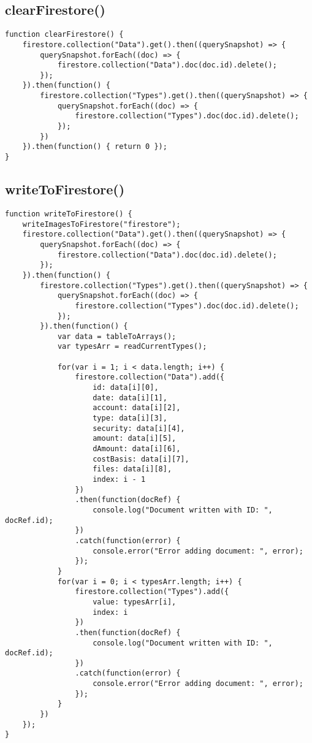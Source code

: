 \documentclass[letterpaper]{article}
\begin{document}
\subsection{clearFirestore()}

\begin{lstlisting}[firstnumber=61]
function clearFirestore() {
    firestore.collection("Data").get().then((querySnapshot) => {
        querySnapshot.forEach((doc) => {
            firestore.collection("Data").doc(doc.id).delete();
        });
    }).then(function() {
        firestore.collection("Types").get().then((querySnapshot) => {
            querySnapshot.forEach((doc) => {
                firestore.collection("Types").doc(doc.id).delete();
            });
        })
    }).then(function() { return 0 });
}
\end{lstlisting}

\subsection{writeToFirestore()}

\begin{lstlisting}[firstnumber=75]
function writeToFirestore() {
    writeImagesToFirestore("firestore");
    firestore.collection("Data").get().then((querySnapshot) => {
        querySnapshot.forEach((doc) => {
            firestore.collection("Data").doc(doc.id).delete();
        });
    }).then(function() {
        firestore.collection("Types").get().then((querySnapshot) => {
            querySnapshot.forEach((doc) => {
                firestore.collection("Types").doc(doc.id).delete();
            });
        }).then(function() {
            var data = tableToArrays();
            var typesArr = readCurrentTypes();

            for(var i = 1; i < data.length; i++) {
                firestore.collection("Data").add({
                    id: data[i][0],
                    date: data[i][1],
                    account: data[i][2],
                    type: data[i][3],
                    security: data[i][4],
                    amount: data[i][5],
                    dAmount: data[i][6],
                    costBasis: data[i][7],
                    files: data[i][8],
                    index: i - 1
                })
                .then(function(docRef) {
                    console.log("Document written with ID: ", docRef.id);
                })
                .catch(function(error) {
                    console.error("Error adding document: ", error);
                });
            }
            for(var i = 0; i < typesArr.length; i++) {
                firestore.collection("Types").add({
                    value: typesArr[i],
                    index: i
                })
                .then(function(docRef) {
                    console.log("Document written with ID: ", docRef.id);
                })
                .catch(function(error) {
                    console.error("Error adding document: ", error);
                });
            }
        })
    });
}
\end{lstlisting}
\end{document}

